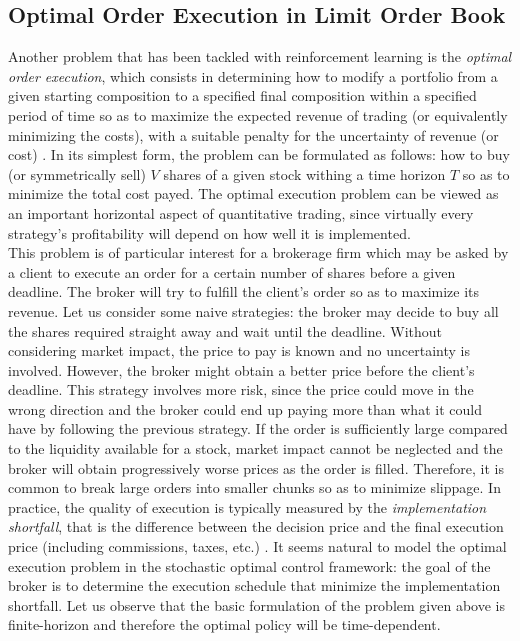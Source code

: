 \subsection{Optimal Order Execution in Limit Order Book}
Another problem that has been tackled with reinforcement learning is the \emph{optimal order execution}, which consists in determining how to modify a portfolio from a given starting composition to a specified final composition within a specified period of time so as to maximize the expected revenue of trading (or equivalently minimizing the costs), with a suitable penalty for the uncertainty of revenue (or cost) \cite{almgren2001optimal}. In its simplest form, the problem can be formulated as follows: how to buy (or symmetrically sell) $V$ shares of a given stock withing a time horizon $T$ so as to minimize the total cost payed. The optimal execution problem can be viewed as an important horizontal aspect of quantitative trading, since virtually every strategy's profitability will depend on how well it is implemented.\\
This problem is of particular interest for a brokerage firm which may be asked by a client to execute an order for a certain number of shares before a given deadline. The broker will try to fulfill the client's order so as to maximize its revenue. Let us consider some naive strategies: the broker may decide to buy all the shares required straight away and wait until the deadline. Without considering market impact, the price to pay is known and no uncertainty is involved. However, the broker might obtain a better price before the client's deadline. This strategy involves more risk, since the price could move in the wrong direction and the broker could end up paying more than what it could have by following the previous strategy. If the order is sufficiently large compared to the liquidity available for a stock, market impact cannot be neglected and the broker will obtain progressively worse prices as the order is filled. Therefore, it is common to break large orders into smaller chunks so as to minimize slippage. In practice, the quality of execution is typically measured by the \emph{implementation shortfall}, that is the difference between the decision price and the final execution price (including commissions, taxes, etc.) \cite{johnson2010algorithmic}. It seems natural to model the optimal execution problem in the stochastic optimal control framework: the goal of the broker is to determine the execution schedule that minimize the implementation shortfall. Let us observe that the basic formulation of the problem given above is finite-horizon and therefore the optimal policy will be time-dependent.\\ 
